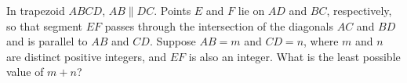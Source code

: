 In trapezoid $ABCD$, $AB\parallel DC$. Points $E$ and $F$ lie on $AD$ and $BC$, respectively, so that segment $EF$ passes through the intersection of the diagonals $AC$ and $BD$ and is parallel to $AB$ and $CD$. Suppose $AB=m$ and $CD=n$, where $m$ and $n$ are distinct positive integers, and $EF$ is also an integer. What is the least possible value of $m+n$?
